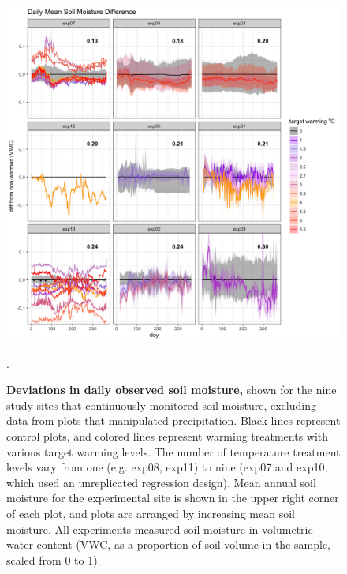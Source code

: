 \documentclass{article}
\begin{document}
 \begin{figure}[h]
    \centering
 \includegraphics{../Analyses/figures/WarmingEffects_TimeSeries_SoilMoist_Deviation_NoPrecip.png}  
 \caption{\textbf{Deviations in daily observed soil moisture,} shown for the nine study sites that continuously monitored soil moisture, excluding data from plots that manipulated precipitation. Black lines represent control plots, and colored lines represent warming treatments with various target warming levels. The number of temperature treatment levels vary from one (e.g. exp08, exp11) to nine (exp07 and exp10, which used an unreplicated regression design). Mean annual soil moisture for the experimental site is shown in the upper right corner of each plot, and plots are arranged by increasing mean soil moisture. All experiments measured soil moisture in volumetric water content (VWC, as a proportion of soil volume in the sample, scaled from 0 to 1).}. 
 \label{fig:mois}
 \end{figure}
\end{document}
